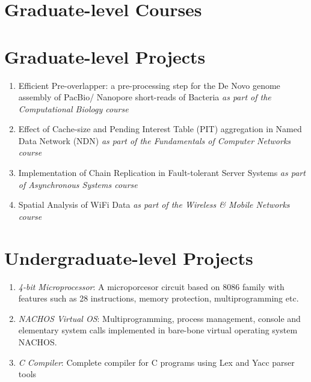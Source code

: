 \documentclass[]{friggeri-cv} %
\begin{document}
\section{Graduate-level Courses}
\begin{entrylist}
\end{entrylist}
\section{Graduate-level Projects} 
\begin{enumerate}
  \item Efficient Pre-overlapper: a pre-processing step for the De Novo
  genome assembly of PacBio/ Nanopore short-reads of Bacteria  
  \textit{as part of the Computational Biology course}
  \item Effect of Cache-size and Pending Interest Table (PIT) aggregation in
  Named Data Network (NDN) \textit{as part of the Fundamentals of Computer
  Networks course} 
  \item Implementation of Chain Replication in Fault-tolerant Server Systems
  \textit{as part of Asynchronous Systems course}
  \item Spatial Analysis of WiFi Data \textit{as part of the Wireless \& Mobile
  Networks course}
\end{enumerate}
\section{Undergraduate-level Projects}
	\begin{enumerate}
	\item \textit{4-bit Microprocessor}: A microporcesor circuit based on 8086
	family with features such as 28 instructions, memory protection,
	multiprogramming etc. 
	\item \textit{NACHOS Virtual OS}: Multiprogramming,
	process management, console and elementary system calls implemented in
	bare-bone virtual operating system NACHOS.
	\item \textit{C Compiler}: Complete compiler for C programs using Lex and
	Yacc parser tools
	\end{enumerate}  
\end{document}
